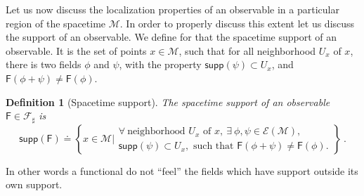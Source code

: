 \documentclass[11pt]{book}
\newcommand{\supp}{\mathsf{supp}}
\newcommand{\Ecal}{\mathcal{E}}
\newcommand{\Fcal}{\mathcal{F}}
\newcommand{\Mcal}{\mathcal{M}}
\newcommand{\Fsf}{\mathsf{F}}
\theoremstyle{break}
\newtheorem{definition}{Definition}
\begin{document}
\bigskip

Let us now discuss the localization properties of an observable in a particular region of the spacetime $\Mcal$. In order to properly discuss this extent let us discuss the support of an observable. We define for that the spacetime support of an observable. It is the set of points $x \in \Mcal$, such that for all neighborhood $U_x$ of $x$, there is two fields $\phi$ and $\psi$, with the property $\supp\left(\psi\right) \subset U_x$, and $\Fsf(\phi+\psi) \neq \Fsf(\phi)$.
%
\begin{definition}[Spacetime support] \label{def:spacetime-supp}
The spacetime support of an observable $\Fsf \in \Fcal_\sharp$ is
%
\begin{equation*}
\supp(\Fsf) \doteq \left\{ x \in \Mcal \bigg| 
\begin{array}{l} 
\forall \ \mbox{neighborhood } U_x \mbox{ of } x, \ \exists \ \phi, \psi \in \Ecal(\Mcal), \\
\supp(\psi) \subset U_x, \mbox{ such that } \Fsf(\phi + \psi) \neq \Fsf(\phi).
\end{array}
\right\} \ .
\end{equation*}
%
\end{definition}
%
In other words a functional do not ``feel'' the fields which have support outside its own support.
\end{document}
